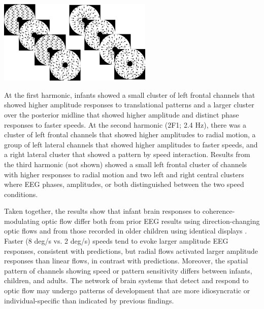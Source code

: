 \documentclass[landscape,final,paperwidth=48in,paperheight=33in,fontscale=0.285]{baposter}
\begin{document}
\begin{poster}
{\begin{center}
\includegraphics[scale=0.1, height=40mm]{FINAL-DISPLAYS.pdf}

\end{center}

}
    {
\par At the first harmonic, infants showed a small cluster of left frontal channels that showed higher amplitude responses to translational patterns and a larger cluster over the posterior midline that showed higher amplitude and distinct phase responses to faster speeds. At the second harmonic (2F1; 2.4 Hz), there was a cluster of left frontal channels that showed higher amplitudes to radial motion, a group of left lateral channels that showed higher amplitudes to faster speeds, and a right lateral cluster that showed a pattern by speed interaction. Results from the third harmonic (not shown) showed a small left frontal cluster of channels with higher responses to radial motion and two left and right central clusters where EEG phases, amplitudes, or both distinguished between the two speed conditions.

Taken together, the results show that infant brain responses to coherence-modulating optic flow differ both from prior EEG results using direction-changing optic flows \cite{Gilmore2007-od} and from those recorded in older children using identical displays \cite{Gilmore2016-sd}. Faster (8 deg/s vs. 2 deg/s) speeds tend to evoke larger amplitude EEG responses, consistent with predictions, but radial flows activated larger amplitude responses than linear flows, in contrast with predictions. Moreover, the spatial pattern of channels showing speed or pattern sensitivity differs between infants, children, and adults. The network of brain systems that detect and respond to optic flow may undergo patterns of development that are more idiosyncratic or individual-specific than indicated by previous findings.

}
\end{poster}
\end{document}

